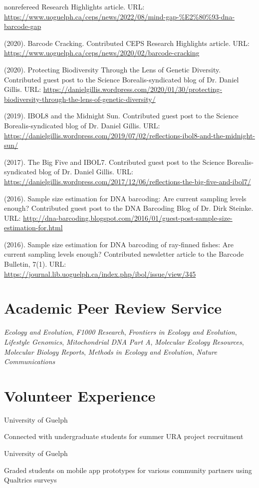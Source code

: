 \begin{revlist}[itemsep=0.45\baselineskip]{nonrefereed}
  Research Highlights article. URL:
  \url{https://www.uoguelph.ca/ceps/news/2022/08/mind-gap-%E2%80%93-dna-barcode-gap}
\item \me (2020). Barcode Cracking. Contributed CEPS Research Highlights
  article. URL: \url{https://www.uoguelph.ca/ceps/news/2020/02/barcode-cracking}
\item \me (2020). Protecting Biodiversity Through the Lens of Genetic Diversity.
  Contributed guest post to the Science Borealis-syndicated blog of
  Dr. Daniel Gillis. URL:
  \url{https://danielgillis.wordpress.com/2020/01/30/protecting-biodiversity-through-the-lens-of-genetic-diversity/}
\item \me (2019). IBOL8 and the Midnight Sun. Contributed guest post to the
  Science Borealis-syndicated blog of Dr. Daniel Gillis. URL:
  \url{https://danielgillis.wordpress.com/2019/07/02/reflections-ibol8-and-the-midnight-sun/}
\item \me (2017). The Big Five and IBOL7. Contributed guest post to the Science
  Borealis-syndicated blog of Dr. Daniel Gillis. URL:
  \url{https://danielgillis.wordpress.com/2017/12/06/reflections-the-big-five-and-ibol7/}
\item \me (2016). Sample size estimation for DNA barcoding: Are current sampling
  levels enough? Contributed guest post to the DNA Barcoding Blog of
  Dr. Dirk Steinke. URL:
  \url{http://dna-barcoding.blogspot.com/2016/01/guest-post-sample-size-estimation-for.html}
\item \me (2016). Sample size estimation for DNA barcoding of ray-finned fishes:
  Are current sampling levels enough? Contributed newsletter article to the
  Barcode Bulletin, 7(1). URL:
  \url{https://journal.lib.uoguelph.ca/index.php/ibol/issue/view/345}
\end{revlist}

\section{Academic Peer Review Service}
\textit{Ecology and Evolution}, \textit{F1000 Research}, \textit{Frontiers in
Ecology and Evolution}, \textit{Lifestyle Genomics}, \textit{Mitochondrial DNA
Part A}, \textit{Molecular Ecology Resources}, \textit{Molecular Biology
Reports}, \textit{Methods in Ecology and Evolution}, \textit{Nature
Communications}

\section{Volunteer Experience}
University of Guelph
\begin{cvbullets}
  \item Connected with undergraduate students for summer URA project recruitment
\end{cvbullets}

\medskip
{}
University of Guelph
\begin{cvbullets}
  \item Graded students on mobile app prototypes for various community partners using Qualtrics surveys
\end{cvbullets}


